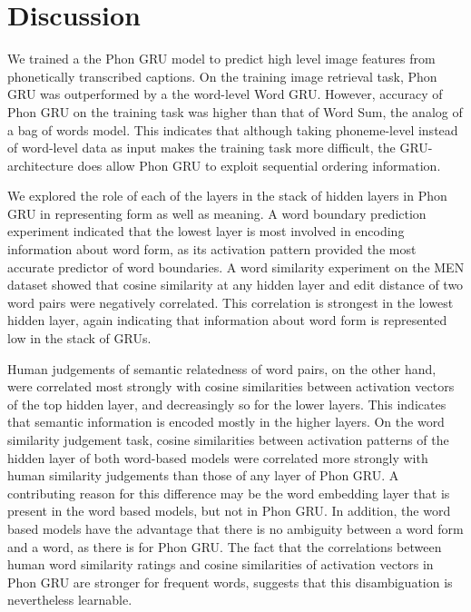 \section{Discussion}
\label{sec:discussion}
We trained a the {\sc Phon GRU} model  to predict high level image features  from phonetically transcribed captions. On the training image retrieval task, {\sc Phon GRU} was outperformed by a the word-level {\sc Word GRU}. However, accuracy of {\sc Phon GRU} on the training task was higher than that of {\sc Word Sum}, the analog of a bag of words model. This indicates that although taking phoneme-level instead of word-level data as input makes the training task more difficult, the GRU-architecture does allow {\sc Phon GRU} to exploit sequential ordering information.

We explored the role of each of the layers in the stack of hidden layers in {\sc Phon GRU} in representing form as well as meaning. A word boundary prediction experiment indicated that the lowest layer is most involved in encoding information about word form, as its activation pattern provided the most accurate predictor of word boundaries. A word similarity experiment on the MEN dataset showed that cosine similarity at any hidden layer and edit distance of two word pairs were negatively correlated. This correlation is strongest in the lowest hidden layer, again indicating that information about word form is represented low in the stack of GRUs.

Human judgements of semantic relatedness of word pairs, on the other hand, were correlated most strongly with cosine similarities between activation vectors of the top hidden layer, and decreasingly so for the lower layers. This indicates that semantic information is encoded mostly in the higher layers. On the word similarity judgement task, cosine similarities between activation patterns of the hidden layer of both word-based models were correlated more strongly with human similarity judgements than those of any layer of {\sc Phon GRU}. A contributing reason for this difference may be the word embedding layer that is present in the word based models, but not in {\sc Phon GRU}. In addition, the word based models have the advantage that there is no ambiguity between a word form and a word, as there is for {\sc Phon GRU}. The fact that the correlations between human word similarity ratings and cosine similarities of activation vectors in {\sc Phon GRU} are stronger for frequent words, suggests that this disambiguation is nevertheless learnable.

